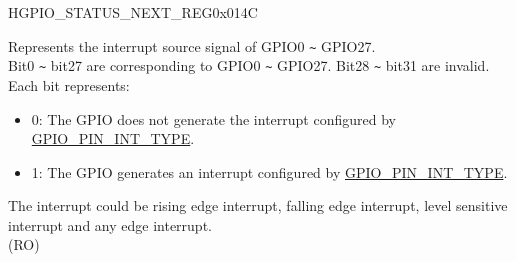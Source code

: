\begin{register}{H}{GPIO\_STATUS\_NEXT\_REG}{0x014C}\label{regdesc:GPIOSTATUSNEXTREG}
%
\regnewline%
\begin{regdesc}\begin{reglist}
\label{fielddesc:GPIOSTATUSINTERRUPTNEXT}\item [GPIO\_STATUS\_INTERRUPT\_NEXT] Represents the interrupt source signal of GPIO0 \verb+~+ GPIO27.\\
Bit0 \verb+~+ bit27 are corresponding to GPIO0 \verb+~+ GPIO27. Bit28 \verb+~+ bit31 are invalid. Each bit represents:\\
\begin{itemize}
    \item 0: The GPIO does not generate the interrupt configured by \hyperref[fielddesc:GPIOPINNINTTYPE]{GPIO\_PIN\_INT\_TYPE}.\\
    \item 1: The GPIO generates an interrupt configured by \hyperref[fielddesc:GPIOPINNINTTYPE]{GPIO\_PIN\_INT\_TYPE}.\\
\end{itemize}
The interrupt could be rising edge interrupt, falling edge interrupt, level sensitive interrupt and any edge interrupt.\\  (RO)

\end{reglist}\end{regdesc}
\end{register}



